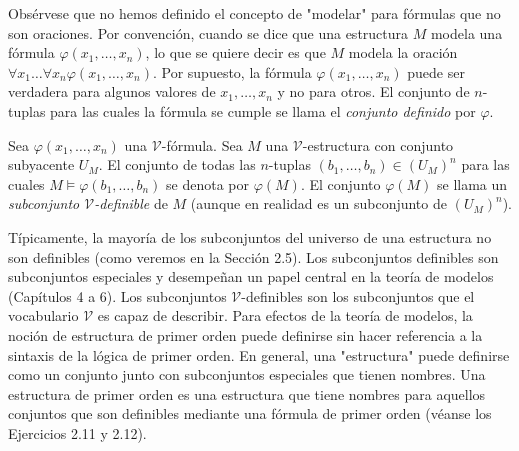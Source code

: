 \documentclass[12pt,a4paper]{book}
\newcommand{\comillas}[1]{"#1"}
\newcommand{\VV}{\mathcal{V}}
\begin{document}
    Obsérvese que no hemos definido el concepto de \comillas{modelar} para fórmulas que no son oraciones. Por convención,
    cuando se dice que una estructura $M$ modela una fórmula $\varphi(x_{1},\dots,x_{n})$, lo que se quiere decir es que $M$
    modela la oración $\forall x_{1}\dots\forall x_{n}\varphi(x_{1},\dots,x_{n})$. Por supuesto, la fórmula
    $\varphi(x_{1},\dots,x_{n})$ puede ser verdadera para algunos valores de $x_{1},\dots,x_{n}$ y no para otros. El
    conjunto de $n$-tuplas para las cuales la fórmula se cumple se llama el \textit{conjunto definido} por $\varphi$.

    \begin{definicion}\label{def:conjunto-definible}
        Sea $\varphi(x_{1},\dots,x_{n})$ una $\VV$-fórmula. Sea $M$ una $\VV$-estructura con conjunto subyacente $U_{M}$. El
        conjunto de todas las $n$-tuplas $(b_{1},\dots,b_{n})\in(U_{M})^{n}$ para las cuales $M\models\varphi(b_{1},\dots,b_{n})$
        se denota por $\varphi(M)$. El conjunto $\varphi(M)$ se llama un \textit{subconjunto $\VV$-definible} de $M$ (aunque
        en realidad es un subconjunto de $(U_{M})^{n}$).
    \end{definicion}

    Típicamente, la mayoría de los subconjuntos del universo de una estructura no son definibles (como veremos en la
    Sección 2.5). Los subconjuntos definibles son subconjuntos especiales y desempeñan un papel central en la teoría de
    modelos (Capítulos 4 a 6). Los subconjuntos $\VV$-definibles son los subconjuntos que el vocabulario $\VV$ es capaz de
    describir. Para efectos de la teoría de modelos, la noción de estructura de primer orden puede definirse sin hacer
    referencia a la sintaxis de la lógica de primer orden. En general, una \comillas{estructura} puede definirse como un
    conjunto junto con subconjuntos especiales que tienen nombres. Una estructura de primer orden es una estructura que
    tiene nombres para aquellos conjuntos que son definibles mediante una fórmula de primer orden (véanse los Ejercicios
    2.11 y 2.12).
\end{document}
